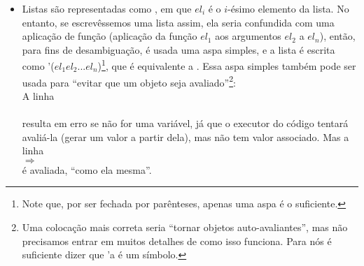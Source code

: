 \documentclass{article}
\begin{document}
\begin{itemize}
\item Listas são representadas como , em que $el_i$ é o $i$-ésimo elemento da lista. No entanto, se
  escrevêssemos uma lista assim, ela seria
  confundida com uma aplicação de função (aplicação da função $el_1$
  aos argumentos $el_2$ a $el_n$), então, para fins de
  desambiguação, é usada uma aspa simples, e a lista é escrita como
  '($el_1 el_2 ... el_n$)\footnote{Note que, por ser fechada por
    parênteses, apenas uma aspa é o suficiente.}, que é equivalente a  . Essa aspa simples também pode ser usada para
  ``evitar que um objeto seja avaliado''\footnote{Uma colocação mais
    correta seria ``tornar objetos auto-avaliantes'', mas não
    precisamos entrar em muitos detalhes de como isso funciona. Para
    nós é suficiente dizer que 'a é um símbolo.}:\\
  A linha\\
  \\
  resulta em erro se  não for uma variável, já que
  o executor do código tentará avaliá-la (gerar um valor a partir
  dela), mas \codigo{a} não tem valor associado. Mas a linha\\
  \codigo{'a} $\Rightarrow $ \codigo{'a}\\
  é avaliada, ``como ela mesma''.\\


\end{itemize}
\end{document}
